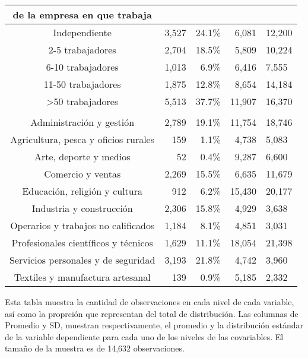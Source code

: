 \begin{longtable}{crrrl}
{{de la empresa en que trabaja}} \\[2.5pt] 
\midrule\addlinespace[2.5pt]
Independiente & 3,527 & 24.1\% &  6,081 & 12,200 \\ 
2-5 trabajadores & 2,704 & 18.5\% &  5,809 & 10,224 \\ 
6-10 trabajadores & 1,013 &  6.9\% &  6,416 &  7,555 \\ 
11-50 trabajadores & 1,875 & 12.8\% &  8,654 & 14,184 \\ 
>50 trabajadores & 5,513 & 37.7\% & 11,907 & 16,370 \\ 
\midrule\addlinespace[2.5pt]
\multicolumn{5}{l}{{\bfseries Oficio}} \\[2.5pt] 
\midrule\addlinespace[2.5pt]
Administración y gestión & 2,789 & 19.1\% & 11,754 & 18,746 \\ 
Agricultura, pesca y oficios rurales &   159 &  1.1\% &  4,738 &  5,083 \\ 
Arte, deporte y medios &    52 &  0.4\% &  9,287 &  6,600 \\ 
Comercio y ventas & 2,269 & 15.5\% &  6,635 & 11,679 \\ 
Educación, religión y cultura &   912 &  6.2\% & 15,430 & 20,177 \\ 
Industria y construcción & 2,306 & 15.8\% &  4,929 &  3,638 \\ 
Operarios y trabajos no calificados & 1,184 &  8.1\% &  4,851 &  3,031 \\ 
Profesionales científicos y técnicos & 1,629 & 11.1\% & 18,054 & 21,398 \\ 
Servicios personales y de seguridad & 3,193 & 21.8\% &  4,742 &  3,960 \\ 
Textiles y manufactura artesanal &   139 &  0.9\% &  5,185 &  2,332 \\ 
\bottomrule
\end{longtable}
\begin{minipage}{\linewidth}
Esta tabla muestra la cantidad de observaciones en cada nivel de cada variable, 
                                             así como la proprción que representan del total de distribución.
                                             Las columnas de Promedio y SD, muestran respectivamente, el promedio y la distribución estándar
                                             de la variable dependiente para cada uno de los niveles de las covariables. 
                                             El tamaño de la muestra es de 14,632 observaciones.\\
\end{minipage}
\endgroup
